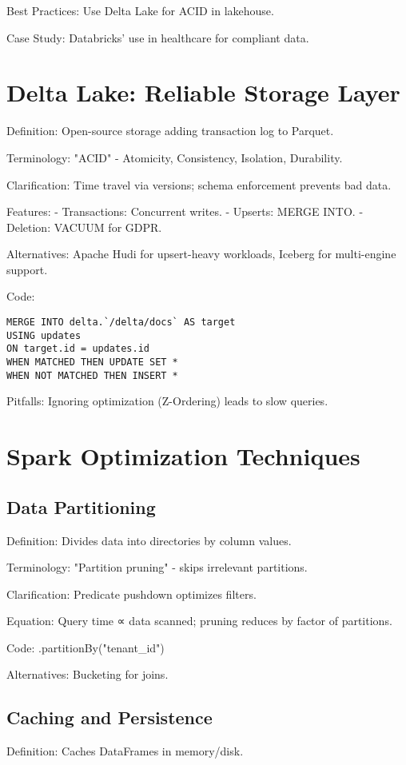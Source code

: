 \documentclass[11pt]{article}
\begin{document}
Best Practices: Use Delta Lake for ACID in lakehouse.

Case Study: Databricks' use in healthcare for compliant data.

\section{Delta Lake: Reliable Storage Layer}
Definition: Open-source storage adding transaction log to Parquet.

Terminology: "ACID" - Atomicity, Consistency, Isolation, Durability.

Clarification: Time travel via versions; schema enforcement prevents bad data.

Features:
- Transactions: Concurrent writes.
- Upserts: MERGE INTO.
- Deletion: VACUUM for GDPR.

Alternatives: Apache Hudi for upsert-heavy workloads, Iceberg for multi-engine support.

Code:
\begin{verbatim}
MERGE INTO delta.`/delta/docs` AS target
USING updates
ON target.id = updates.id
WHEN MATCHED THEN UPDATE SET *
WHEN NOT MATCHED THEN INSERT *
\end{verbatim}

Pitfalls: Ignoring optimization (Z-Ordering) leads to slow queries.

\section{Spark Optimization Techniques}
\subsection{Data Partitioning}
Definition: Divides data into directories by column values.

Terminology: "Partition pruning" - skips irrelevant partitions.

Clarification: Predicate pushdown optimizes filters.

Equation: Query time ∝ data scanned; pruning reduces by factor of partitions.

Code: .partitionBy("tenant_id")

Alternatives: Bucketing for joins.

\subsection{Caching and Persistence}
Definition: Caches DataFrames in memory/disk.
\end{document}
